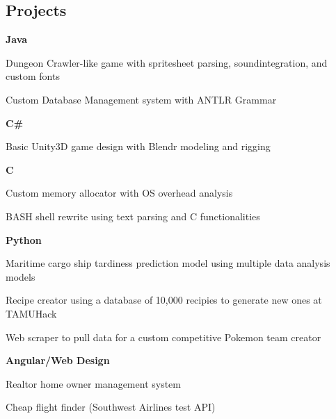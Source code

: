 \documentclass[10pt,letterpaper]{article}
\newenvironment{indentsection}[1]%
{\begin{list}{}%
	{\setlength{\leftmargin}{#1}}%
	\item[]%
}
{\end{list}}
\newcommand{\CPP}
{C\nolinebreak[4]\hspace{-.05em}\raisebox{.22ex}{\footnotesize\bf ++}}
\begin{document}
	\subsection*{Projects}
	\begin{indentsection}{\parindent}
		\begin{itemize*}
		\item \textbf{Java} 
		\vspace{-0.2em}
			\begin{itemize*}
				\item Dungeon Crawler-like game with spritesheet parsing, soundintegration, and custom fonts 
				\item Custom Database Management system with ANTLR Grammar
			\end{itemize*}
		\item \textbf{C\#} 
		\vspace{-0.2em}
			\begin{itemize*}
				\item Basic Unity3D game design with Blendr modeling and rigging 
			\end{itemize*}
		\item \textbf{\CPP}
		\vspace{-0.2em}
			\begin{itemize*}
				\item Custom memory allocator with OS overhead analysis
				\item BASH shell rewrite using text parsing and C functionalities 
			\end{itemize*}
		\item \textbf{Python}
		\vspace{-0.2em}
			\begin{itemize*}
				\item Maritime cargo ship tardiness prediction model using multiple data analysis models
				\item Recipe creator using a database of 10,000 recipies to generate new ones at TAMUHack 
				\item Web scraper to pull data for a custom competitive Pokemon team creator
		\end{itemize*}
		\item \textbf{Angular/Web Design}
		\vspace{-0.2em}
			\begin{itemize*}
				\item Realtor home owner management system
				\item Cheap flight finder (Southwest Airlines test API)
			\end{itemize*}
		\end{itemize*}
	\end{indentsection}
\end{document}
